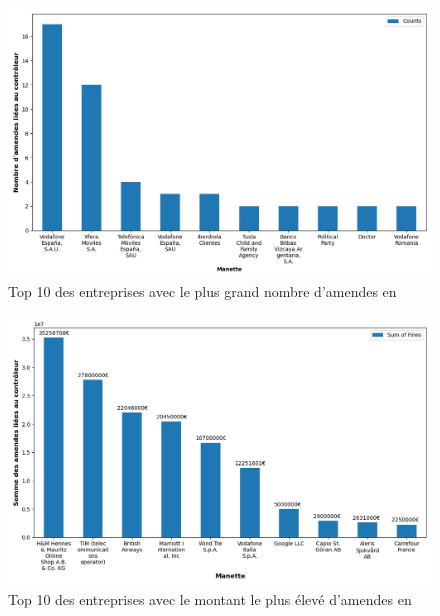 \documentclass[french]{article}
\begin{document}
\newpage

	
	\begin{multicols}{2}
	\begin{figure}
		[H]\centering\includegraphics[width=1.0\linewidth]{graphs/top10_controller_year}
		\caption{Top 10 des entreprises avec le plus grand nombre d'amendes en}
	\end{figure}
	\begin{figure}
		[H]\centering\includegraphics[width=1\linewidth]{graphs/top10_controller_year_fines}
		\caption{Top 10 des entreprises avec le montant le plus élevé d'amendes en }
	 \end{figure}
	
	\end{multicols}
\end{document}
